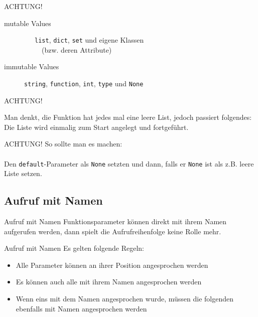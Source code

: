 \begin{frame}{ACHTUNG!}
	\\[1cm]
	\begin{description}
		\item[mutable Values] \ \ \ \texttt{list}, \texttt{dict}, \texttt{set} und eigene Klassen \\
\ \ \ \ \ (bzw. deren Attribute)
		\item[immutable Values] \texttt{string}, \texttt{function}, \texttt{int}, \texttt{type} und \texttt{None}
	\end{description}
\end{frame}

\begin{frame}{ACHTUNG!}
	
	Man denkt, die Funktion hat jedes mal eine leere List, jedoch passiert folgendes:\\
	
	Die Liste wird einmalig zum Start angelegt und fortgeführt.
\end{frame}

\begin{frame}[fragile]{ACHTUNG!}
	So sollte man es machen:\\[.5cm]
	
	\ \\[.5cm]
	Den \texttt{default}-Parameter als \texttt{None} setzten und dann, falls er \texttt{None} ist als z.B. leere Liste setzen.
\end{frame}

\subsection{Aufruf mit Namen}
\begin{frame}[fragile]{Aufruf mit Namen}
	Funktionsparameter können direkt mit ihrem Namen aufgerufen werden, dann spielt die Aufrufreihenfolge keine Rolle mehr.\\[1cm]
	
\end{frame}

\begin{frame}{Aufruf mit Namen}
	Es gelten folgende Regeln:
	\begin{itemize}
		\item Alle Parameter können an ihrer Position angesprochen werden
		\item Es können auch alle mit ihrem Namen angesprochen werden
		\item Wenn eins mit dem Namen angesprochen wurde, m\"ussen die folgenden ebenfalls mit Namen angesprochen werden
	\end{itemize}	
\end{frame}



